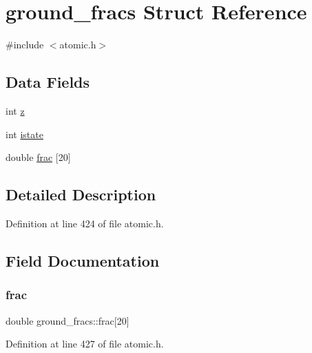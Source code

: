 \hypertarget{structground__fracs}{}\section{ground\+\_\+fracs Struct Reference}
\label{structground__fracs}


{\ttfamily \#include $<$atomic.\+h$>$}

\subsection*{Data Fields}
\begin{DoxyCompactItemize}
\item 
int \hyperlink{structground__fracs_ae8df1c2f77e5817ae6e30708517be5ab}{z}
\item 
int \hyperlink{structground__fracs_a1dcdae086f4bb5a97a3d0560caaa51b6}{istate}
\item 
double \hyperlink{structground__fracs_a361efb237032c0850a08170da7e271a5}{frac} \mbox{[}20\mbox{]}
\end{DoxyCompactItemize}


\subsection{Detailed Description}


Definition at line 424 of file atomic.\+h.



\subsection{Field Documentation}
\mbox{\label{structground__fracs_a361efb237032c0850a08170da7e271a5}} 
\subsubsection{\texorpdfstring{frac}{frac}}
{\footnotesize\ttfamily double ground\+\_\+fracs\+::frac\mbox{[}20\mbox{]}}



Definition at line 427 of file atomic.\+h.

\mbox{\label{structground__fracs_a1dcdae086f4bb5a97a3d0560caaa51b6}} 
